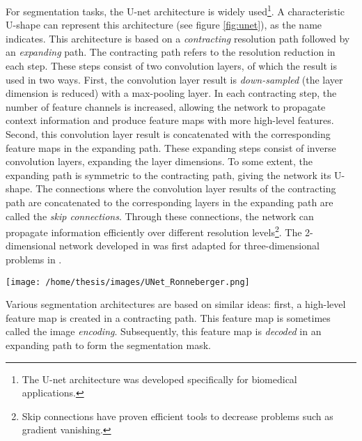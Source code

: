 \par{
    For segmentation tasks, the U-net architecture\cite{Ronneberger2015} is widely used\footnote{The U-net architecture was developed specifically for biomedical applications.}. 
    A characteristic U-shape can represent this architecture (see figure \ref{fig:unet}), as the name indicates.
    This architecture is based on a \textit{contracting} resolution path followed by an \textit{expanding} path. 
    The contracting path refers to the resolution reduction in each step. 
    These steps consist of two convolution layers, of which the result is used in two ways. 
    First, the convolution layer result is \textit{down-sampled} (the layer dimension is reduced) with a max-pooling layer.
    In each contracting step, the number of feature channels is increased, allowing the network to propagate context information and produce feature maps with more high-level features.
    Second, this convolution layer result is concatenated with the corresponding feature maps in the expanding path.
    These expanding steps consist of inverse convolution layers, expanding the layer dimensions. To some extent, the expanding path is symmetric to the contracting path, giving the network its U-shape. 
    The connections where the convolution layer results of the contracting path are concatenated to the corresponding layers in the expanding path are called the \textit{skip connections}.
    Through these connections, the network can propagate information efficiently over different resolution levels\footnote{Skip connections have proven efficient tools to decrease problems such as gradient vanishing.}.
    The 2-dimensional network developed in \cite{Ronneberger2015} was first adapted for three-dimensional problems in \cite{Cicek2016}.
}
\begin{SCfigure}[][htb]
    \texttt{[image: /home/thesis/images/UNet\_Ronneberger.png]}
    \caption{U-Net architecture, as illustrated in \cite{Ronneberger2015}. 
    Each blue box represents a multi-channel feature-map. 
    The number of channels is indicated above the box, the $x \times y$ dimensions are indicated at the bottom left.
    The gray arrows indicate the feature maps in the contracting path are copied and concatenated to the feature maps of the expanding path.}
    \label{fig:unet}
\end{SCfigure}
\par{
    Various segmentation architectures are based on similar ideas: first, a high-level feature map is created in a contracting path. 
    This feature map is sometimes called the image \textit{encoding}. 
    Subsequently, this feature map is \textit{decoded} in an expanding path to form the segmentation mask. 
}


